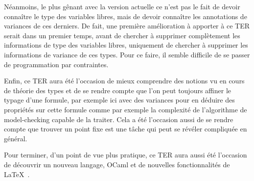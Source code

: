 \documentclass{rapport}
\theoremstyle{plain}
\theoremstyle{remark}
\theoremstyle{definition}
\begin{document}
Néanmoins, le plus gênant avec la version actuelle ce n'est pas le fait de devoir connaître le type des variables libres, mais de devoir connaître les annotations de variances de ces derniers. De fait, une première amélioration à apporter à ce TER serait dans un premier temps, avant de chercher à supprimer complètement les informations de type des variables libres, uniquement de chercher à supprimer les informations de variance de ces types. Pour ce faire, il semble difficile de se passer de programmation par contraintes. 

Enfin, ce TER aura été l'occasion de mieux comprendre des notions vu en cours de théorie des types et de se rendre compte que l'on peut toujours affiner le typage d'une formule, par exemple ici avec des variances pour en déduire des propriétés sur cette formule comme par exemple la complexité de l'algorithme de model-checking capable de la traiter. Cela a été l'occasion aussi de se rendre compte que trouver un point fixe est une tâche qui peut se révéler compliquée en général. 

Pour terminer, d'un point de vue plus pratique, ce TER aura aussi été l'occasion de découvrir un nouveau langage, OCaml et de nouvelles fonctionnalités de \LaTeX~.   



\end{document}

